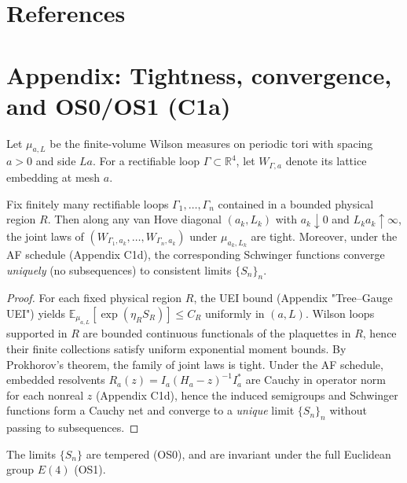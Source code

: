 \documentclass[11pt]{amsart}
\begin{document}
\section{References}

\section{Appendix: Tightness, convergence, and OS0/OS1 (C1a)}

Let $\mu_{a,L}$ be the finite-volume Wilson measures on periodic tori with spacing $a>0$ and side $L a$. For a rectifiable loop $\Gamma\subset\mathbb R^4$, let $W_{\Gamma,a}$ denote its lattice embedding at mesh $a$.

\begin{theorem}\label{thm:c1a-tight}
Fix finitely many rectifiable loops $\Gamma_1,\dots,\Gamma_n$ contained in a bounded physical region $R$. Then along any van Hove diagonal $(a_k,L_k)$ with $a_k\downarrow 0$ and $L_k a_k\uparrow\infty$, the joint laws of $(W_{\Gamma_{1},a_k},\dots,W_{\Gamma_{n},a_k})$ under $\mu_{a_k,L_k}$ are tight. Moreover, under the AF schedule (Appendix C1d), the corresponding Schwinger functions converge \emph{uniquely} (no subsequences) to consistent limits $\{S_n\}_n$.
\end{theorem}

\begin{proof}
For each fixed physical region $R$, the UEI bound (Appendix "Tree--Gauge UEI") yields $\mathbb{E}_{\mu_{a,L}}\![\exp(\eta_R S_R)]\le C_R$ uniformly in $(a,L)$. Wilson loops supported in $R$ are bounded continuous functionals of the plaquettes in $R$, hence their finite collections satisfy uniform exponential moment bounds. By Prokhorov's theorem, the family of joint laws is tight. Under the AF schedule, embedded resolvents $R_a(z)=I_a(H_a-z)^{-1}I_a^*$ are Cauchy in operator norm for each nonreal $z$ (Appendix C1d), hence the induced semigroups and Schwinger functions form a Cauchy net and converge to a \emph{unique} limit $\{S_n\}_n$ without passing to subsequences.
\end{proof}

\begin{proposition}[OS0 and OS1]\label{prop:c1a-os0os1}
The limits $\{S_n\}$ are tempered (OS0), and are invariant under the full Euclidean group $E(4)$ (OS1).
\end{proposition}
\end{document}
